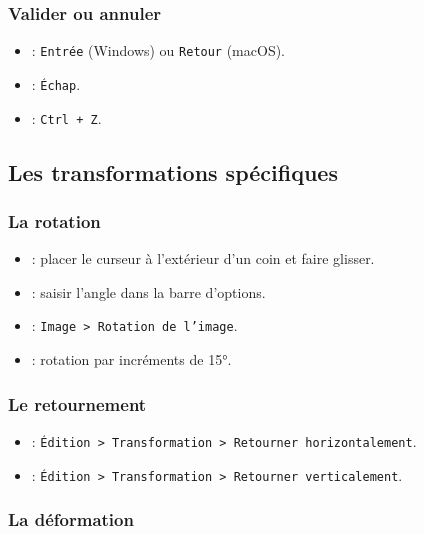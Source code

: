 \subsubsection{Valider ou annuler}

\begin{itemize}
    \item {} : \texttt{Entrée} (Windows) ou \texttt{Retour} (macOS).
    \item {} : \texttt{Échap}.
    \item {} : \texttt{Ctrl + Z}.
\end{itemize}

\subsection{Les transformations spécifiques}

\subsubsection{La rotation}

\begin{itemize}
    \item {} : placer le curseur à l'extérieur d'un coin et faire glisser.
    \item {} : saisir l'angle dans la barre d'options.
    \item {} : \texttt{Image > Rotation de l'image}.
    \item {} : rotation par incréments de 15°.
\end{itemize}

\subsubsection{Le retournement}

\begin{itemize}
    \item {} : \texttt{Édition > Transformation > Retourner horizontalement}.
    \item {} : \texttt{Édition > Transformation > Retourner verticalement}.
\end{itemize}

\subsubsection{La déformation}

